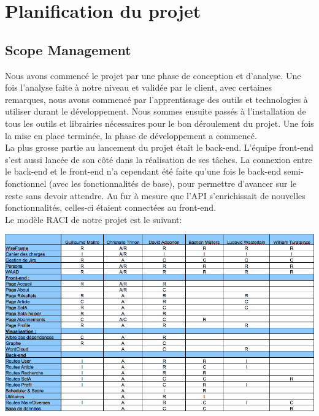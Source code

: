 \documentclass[t, 12pt, usenames,dvipsnames]{article}
\begin{document}
    
    
    \newpage
    
    \section{Planification du projet}
        \subsection{Scope Management}
        \noindent Nous avons commencé le projet par une phase de conception et d'analyse. Une fois l'analyse faite à notre niveau et validée par le client, avec certaines remarques, nous avons commencé par l'apprentissage des outils et technologies à utiliser durant le développement. Nous sommes ensuite passés à l'installation de tous les outils et librairies nécessaires pour le bon déroulement du projet. Une fois la mise en place terminée, la phase de développement a commencé.\\
        La plus grosse partie au lancement du projet était le back-end. L'équipe front-end s'est aussi lancée de son côté dans la réalisation de ses tâches. La connexion entre le back-end et le front-end n'a cependant été faite qu'une fois le back-end semi-fonctionnel (avec les fonctionnalités de base), pour permettre d'avancer sur le reste sans devoir attendre. Au fur à mesure que l'API s'enrichissait de nouvelles fonctionnalités, celles-ci étaient connectées au front-end.\\
        Le modèle RACI de notre projet est le suivant:
        \begin{center}
            \includegraphics[scale=.5]{images/RACI.png}
            \label{fig:modele_raci}
        \end{center}
            
\end{document}
